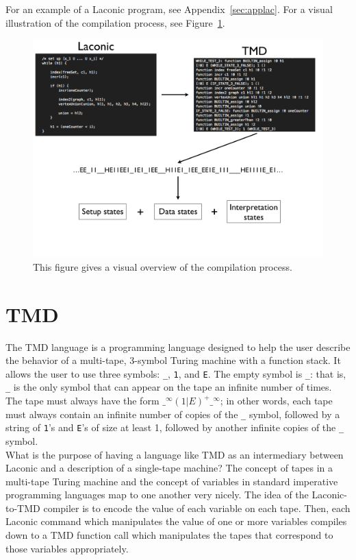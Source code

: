 \documentclass[11pt]{article}
\begin{document}
For an example of a Laconic program, see Appendix~\ref{sec:applac}. For a visual illustration of the compilation process, see Figure~\ref{fig:compilation}.

\begin{figure} 
\begin{center} 
\includegraphics[scale=0.42]{figs/compilation.png}
\caption{This figure gives a visual overview of the compilation process. \label{fig:compilation}} 
\end{center} 
\end{figure}

\section{TMD}

The TMD language is a programming language designed to help the user describe the behavior of a multi-tape, 3-symbol Turing machine with a function stack. It allows the user to use three symbols: \texttt{\_}, \texttt{1}, and \texttt{E}. The empty symbol is \texttt{\_}: that is, \texttt{\_} is the only symbol that can appear on the tape an infinite number of times. The tape must always have the form $\texttt{\_}^{\infty}(1|E)^+\texttt{\_}^{\infty}$; in other words, each tape must always contain an infinite number of copies of the \texttt{\_} symbol, followed by a string of \texttt{1}'s and \texttt{E}'s of size at least 1, followed by another infinite copies of the \texttt{\_} symbol. \\

What is the purpose of having a language like TMD as an intermediary between Laconic and a description of a single-tape machine? The concept of tapes in a multi-tape Turing machine and the concept of variables in standard imperative programming languages map to one another very nicely. The idea of the Laconic-to-TMD compiler is to encode the value of each variable on each tape. Then, each Laconic command which manipulates the value of one or more variables compiles down to a TMD function call which manipulates the tapes that correspond to those variables appropriately. \\
\end{document}

